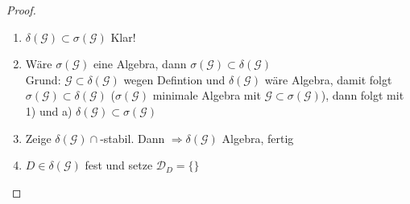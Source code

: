 \begin{proof}
	\begin{enumerate}[label=(\arabic*)]
		\item $\delta(\mathscr{G}) \subset \sigma(\mathscr{G})$ Klar!
		\item Wäre $\sigma(\mathscr{G})$ eine Algebra, dann $\sigma(\mathscr{G}) \subset \delta(\mathscr{G})$\\
		Grund: $\mathscr{G} \subset \delta(\mathscr{G})$ wegen Defintion und $\delta(\mathscr{G})$ wäre Algebra, damit folgt $\sigma(\mathscr{G}) \subset \delta(\mathscr{G})$ ($\sigma(\mathscr{G})$ minimale Algebra mit $\mathscr{G} \subset \sigma(\mathscr{G})$), dann folgt mit 1) und a) $\delta(\mathscr{G}) \subset \sigma(\mathscr{G})$
		\item Zeige $\delta(\mathscr{G}) \cap$-stabil. Dann  $\Rightarrow \delta(\mathscr{G})$ Algebra, fertig
		\item $D \in \delta(\mathscr{G})$ fest und setze $\mathscr{D}_{D} = \{\}$
	\end{enumerate}
\end{proof}